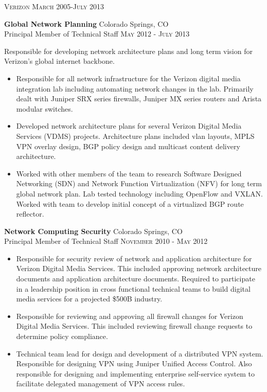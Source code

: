 
\textsc{Verizon} \hfill \textsc{March 2005-July 2013}

\textbf{Global Network Planning} \hfill Colorado Springs, CO\\
Principal Member of Technical Staff \hfill \textsc{May 2012} - \textsc{July 2013}

Responsible for developing network architecture plans and long term
vision for Verizon’s global internet backbone.

\begin{itemize}
\item
Responsible for all network infrastructure for the Verizon digital media
integration lab including automating network changes in the lab.  Primarily
dealt with Juniper SRX series firewalls, Juniper MX series routers and
Arista modular switches.

\item
Developed network architecture plans for several Verizon Digital Media Services
(VDMS) projects.  Architecture plans included vlan layouts, MPLS VPN overlay
design, BGP policy design and multicast content delivery architecture.

\item
Worked with other members of the team to research Software Designed Networking
(SDN) and Network Function Virtualization (NFV) for long term global network
plan.  Lab tested technology including OpenFlow and VXLAN.  Worked with team
to develop initial concept of a virtualized BGP route reflector.
\end{itemize}

\textbf{Network Computing Security} \hfill Colorado Springs, CO\\
Principal Member of Technical Staff \hfill \textsc{November 2010} - \textsc{May 2012}

\begin{itemize}
\item
Responsible for security review of network and application architecture for
Verizon Digital Media Services.  This included approving network architecture
documents and application architecture documents.  Required to participate in a
leadership position in cross functional technical teams to build digital media
services for a projected \$500B industry.

\item
Responsible for reviewing and approving all firewall changes for Verizon Digital
Media Services.  This included reviewing firewall change requests to determine
policy compliance.

\item
Technical team lead for design and development of a distributed VPN system.
Responsible for designing VPN using Juniper Unified Access Control.  Also
responsible for designing and implementing enterprise self-service system to
facilitate delegated management of VPN access rules.
\end{itemize}


